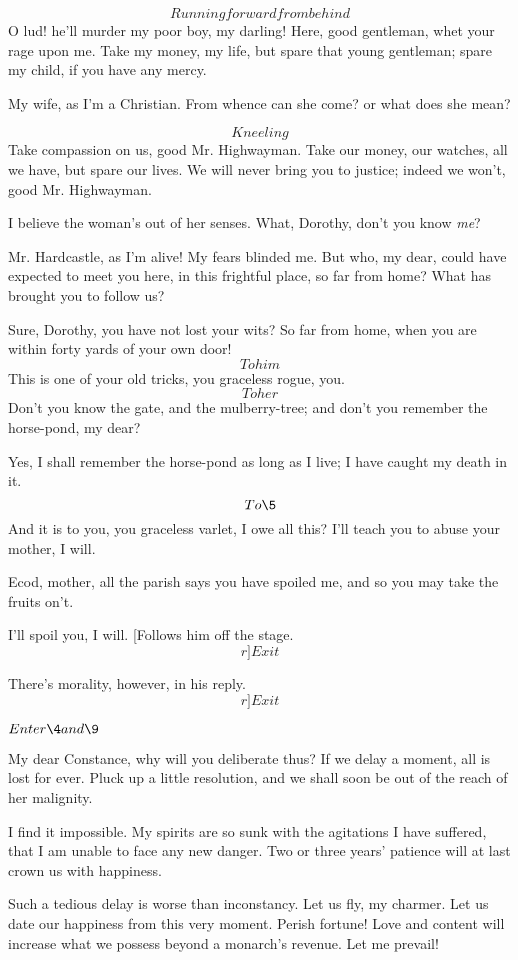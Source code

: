 \documentclass{book}
\begin{document}
\7  \[Running forward from behind\]  O lud! he'll murder
my poor boy, my darling!  Here, good gentleman, whet your rage upon me. 
Take my money, my life, but spare that young gentleman; spare my child,
if you have any mercy.

\3  My wife, as I'm a Christian.  From whence can she come? or
what does she mean?

\7  \[Kneeling\]  Take compassion on us, good Mr.
Highwayman.  Take our money, our watches, all we have, but spare our
lives.  We will never bring you to justice; indeed we won't, good Mr.
Highwayman.

\3  I believe the woman's out of her senses.  What, Dorothy,
don't you know \textit{me}?

\7  Mr. Hardcastle, as I'm alive!  My fears blinded me. 
But who, my dear, could have expected to meet you here, in this
frightful place, so far from home?  What has brought you to follow us?

\3  Sure, Dorothy, you have not lost your wits?  So far from
home, when you are within forty yards of your own door!  \[To him\] 
This is one of your old tricks, you graceless rogue, you.  \[To her\] 
Don't you know the gate, and the mulberry-tree; and don't you remember
the horse-pond, my dear?

\7  Yes, I shall remember the horse-pond as long as I
live; I have caught my death in it.  \[To \5\]  And it is to you, you
graceless varlet, I owe all this?  I'll teach you to abuse your mother,
I will.

\5  Ecod, mother, all the parish says you have spoiled me, and so
you may take the fruits on't.

\7  I'll spoil you, I will.  [Follows him off the stage. 
\[r]Exit\]

\3  There's morality, however, in his reply.  \[r]Exit\]


\(Enter \4 and \9\)


\4  My dear Constance, why will you deliberate thus?  If we
delay a moment, all is lost for ever.  Pluck up a little resolution,
and we shall soon be out of the reach of her malignity.

\9  I find it impossible.  My spirits are so sunk with the
agitations I have suffered, that I am unable to face any new danger. 
Two or three years' patience will at last crown us with happiness.

\4  Such a tedious delay is worse than inconstancy.  Let us fly,
my charmer.  Let us date our happiness from this very moment.  Perish
fortune!  Love and content will increase what we possess beyond a
monarch's revenue.  Let me prevail!
\end{document}
